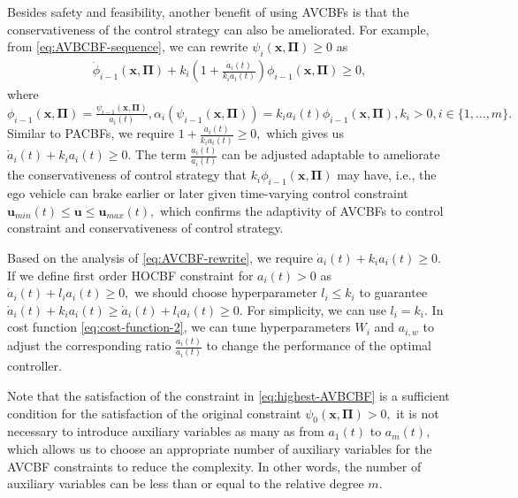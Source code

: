 Besides safety and feasibility, another benefit of using AVCBFs is that the conservativeness of the control strategy can also be ameliorated. For example, from \eqref{eq:AVBCBF-sequence}, we can rewrite $\psi_{i}(\boldsymbol{x},\boldsymbol{\Pi})\ge 0$ as
\begin{equation}
\label{eq:AVCBF-rewrite}
\begin{split}
\dot{\phi}_{i-1}(\boldsymbol{x},\boldsymbol{\Pi})+k_{i}(1+\frac{\dot{a}_{i}(t)}{k_{i}a_{i}(t)}) \phi_{i-1}(\boldsymbol{x},\boldsymbol{\Pi})\ge0,
\end{split}
\end{equation}
where $\phi_{i-1}(\boldsymbol{x},\boldsymbol{\Pi})=\frac{\psi_{i-1}(\boldsymbol{x},\boldsymbol{\Pi})}{a_{i}(t)},\alpha_{i}(\psi_{i-1}(\boldsymbol{x},\boldsymbol{\Pi}))=k_{i}a_{i}(t)\phi_{i-1}(\boldsymbol{x},\boldsymbol{\Pi}), k_{i}>0, i\in \{1,\dots,m\}.$ Similar to PACBFs, we require $1+\frac{\dot{a}_{i}(t)}{k_{i}a_{i}(t)}\ge0,$ which gives us $\dot{a}_{i}(t)+k_{i}a_{i}(t)\ge0.$
The term $\frac{\dot{a}_{i}(t)}{a_{i}(t)}$ can be adjusted adaptable  to ameliorate the conservativeness of control strategy that $k_{i}\phi_{i-1}(\boldsymbol{x},\boldsymbol{\Pi})$ may have, i.e., the ego vehicle can brake earlier or later given time-varying control constraint $\boldsymbol{u}_{min}(t)\le \boldsymbol{u} \le\boldsymbol{u}_{max}(t),$ which confirms the adaptivity of AVCBFs to control constraint and conservativeness of control strategy. 

\begin{remark}
\label{rem: parameter-tuning}
Based on the analysis of \eqref{eq:AVCBF-rewrite}, we require $\dot{a}_{i}(t)+k_{i}a_{i}(t)\ge0.$ If we define first order HOCBF constraint for $a_{i}(t)>0$ as $\dot{a}_{i}(t)+l_{i}a_{i}(t)\ge0,$ we should choose hyperparameter $l_{i}\le k_{i}$ to guarantee $\dot{a}_{i}(t)+k_{i}a_{i}(t)\ge\dot{a}_{i}(t)+l_{i}a_{i}(t)\ge 0.$ For simplicity, we can use $l_{i}=k_{i}.$ In cost function \eqref{eq:cost-function-2}, we can tune hyperparameters $W_{i}$ and $a_{i,w}$ to adjust the corresponding ratio $\frac{\dot{a}_{i}(t)}{a_{i}(t)}$ to change the performance of the optimal controller.
\end{remark}

\begin{remark}
\label{rem: sufficient-con}
Note that the satisfaction of the constraint in \eqref{eq:highest-AVBCBF} is a sufficient condition for the satisfaction of the original constraint $\psi_{0}(\boldsymbol{x},\boldsymbol{\Pi})>0,$ it is not necessary to introduce auxiliary variables as many as from $a_{1}(t)$ to $a_{m}(t),$ which allows us to choose an appropriate
number of auxiliary variables for the AVCBF constraints to reduce the complexity. In other words, the number of auxiliary variables can be less than or equal to the relative degree $m$.
\end{remark}
